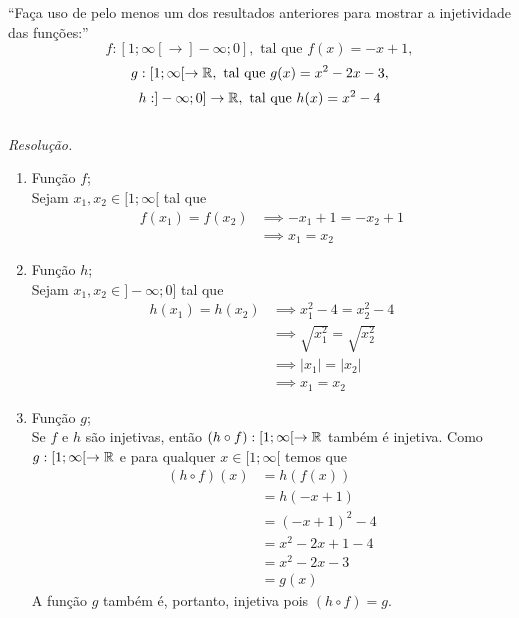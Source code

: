 \enquote{Faça uso de pelo menos um dos resultados anteriores para mostrar a injetividade das funções:}
\begin{displaymath}
    f: [1; \infty[ \rightarrow ]-\infty; 0], \text{ tal que } f(x) = -x + 1, 
\end{displaymath}
\begin{displaymath}
    g: [1; \infty[ \rightarrow \mathbb R, \text{ tal que } g(x) = x^2 - 2x - 3,
\end{displaymath}
\begin{displaymath}
    h: ]-\infty; 0] \rightarrow \mathbb R, \text { tal que } h(x) = x^2 - 4
\end{displaymath} \\
\emph{Resolução.}
\begin{enumerate}
    \item Função $f$; \\
    Sejam $x_1, x_2 \in [1; \infty[$ tal que
    \begin{align*}
        f(x_1) = f(x_2) & \implies -x_1 + 1 = -x_2 + 1 \\ & \implies
        x_1 = x_2
    \end{align*}
    \item Função $h$; \\
    Sejam $x_1, x_2 \in ]-\infty; 0]$ tal que
    \begin{align*}
        h(x_1) = h(x_2) & \implies x_1^2 - 4 = x_2^2 - 4 \\ & \implies
        \sqrt{x_1^2} = \sqrt{x_2^2} \\ & \implies
        |x_1| = |x_2| \\ & \implies
        x_1 = x_2
    \end{align*}
    \item Função $g$; \\
    Se $f$ e $h$ são injetivas, então $(h \circ f): [1; \infty[ \rightarrow \mathbb R$ também é injetiva. Como $g: [1; \infty[ \rightarrow \mathbb R$ e para qualquer $x \in [1; \infty[$ temos que
    \begin{align*}
        (h \circ f)(x) & = h(f(x)) \\ & =
        h(-x + 1) \\ & =
        (-x + 1)^2 - 4 \\ & =
        x^2 - 2x + 1 - 4 \\ & =
        x^2 - 2x - 3 \\ & =
        g(x)         
    \end{align*}
    A função $g$ também é, portanto, injetiva pois $(h \circ f) = g$.
\end{enumerate}